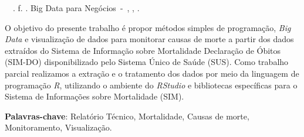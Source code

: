 \setlength{\absparsep}{18pt} %
\begin{resumo}
	\begin{flushleft} 
			\setlength{\absparsep}{0pt} %
			\SingleSpacing 
			\imprimirautorabr~~\textbf{\imprimirtituloresumo}. %
			\pageref{LastPage} f.
			\imprimirtipotrabalho. Big Data para Negócios~-~\textbf{\imprimirinstituicao}, \imprimirlocal, \imprimirdata. 
 	\end{flushleft}
\OnehalfSpacing 			
 O objetivo do presente trabalho é propor métodos simples de programação, \textit{Big Data} e visualização de dados para monitorar causas de morte a partir dos dados extraídos do Sistema de Informação sobre Mortalidade Declaração de Óbitos (SIM-DO) disponibilizado pelo Sistema Único de Saúde (SUS).
 Como trabalho parcial realizamos a extração e o tratamento dos dados por meio da linguagem de programação \textit{R}, utilizando o ambiente do \textit{RStudio} e bibliotecas específicas para o Sistema de Informações sobre Mortalidade (SIM).
 

 \textbf{Palavras-chave}: Relatório Técnico, Mortalidade, Causas de morte, Monitoramento, Visualização.
\end{resumo}